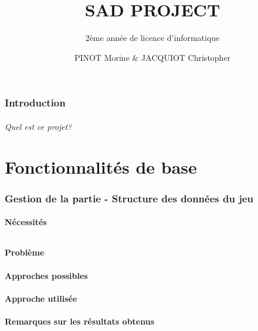 \documentclass{scratcl}
\subtitle{2ème année de licence d'informatique}
\title{SAD PROJECT}
\author{PINOT Morine \& JACQUIOT Christopher}
\begin{document}
    \maketitle
    \tableofcontents

    \section{Introduction}

    \paragraph{Quel est ce projet?}



    \part{Fonctionnalités de base}

    \section{Gestion de la partie - Structure des données du jeu}

    \subsection{Nécessités}

    \paragraph{}

    \subsection{Problème}

    \subsection{Approches possibles}

    \subsection{Approche utilisée}

    \subsection{Remarques sur les résultats obtenus}
\end{document}
